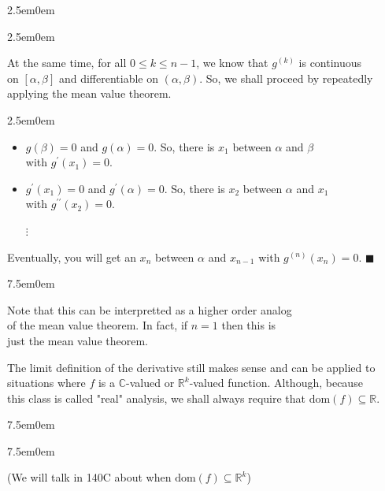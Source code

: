 \documentclass{book}
\newcommand{\teachComment}{
   \color{Orange}%
   \fontsize{12}{14}\selectfont%
}
\newenvironment{myIndent}{%
   \begin{adjustwidth}{2.5em}{0em}%
}{%
   \end{adjustwidth}%
}
\newenvironment{myTindent}{%
   \begin{adjustwidth}{7.5em}{0em}%
}{%
   \end{adjustwidth}%
}
\newcommand{\pprime}{{\prime\prime}}
\newcommand{\domain}[1]{\mathrm{dom}(#1)}
\newcommand{\retTwo}{\hfill\bigbreak}
\begin{document}
{\begin{myIndent}
{\begin{myIndent}
      At the same time, for all $0 \leq k \leq n-1$, we know that $g^{(k)}$ is continuous\\ on $[\alpha, \beta]$ and differentiable on $(\alpha, \beta)$. So, we shall proceed by repeatedly\\ applying the mean value theorem.
      \begin{myIndent}
         \begin{itemize}
            \item $g(\beta) = 0$ and $g(\alpha) = 0$. So, there is $x_1$ between $\alpha$ and $\beta$\\ with $g^\prime(x_1) = 0$.
            \item $g^\prime(x_1) = 0$ and $g^\prime(\alpha) = 0$. So, there is $x_2$ between $\alpha$ and $x_1$\\ with $g^\pprime(x_2) = 0$.
            
            {\centering\fontsize{18}{0}\selectfont $\vdots\phantom{aaaaaaa}$ \retTwo\par}
         \end{itemize}
      \end{myIndent}

      Eventually, you will get an $x_n$ between $\alpha$ and $x_{n-1}$ with $g^{(n)}(x_n) = 0$. $\blacksquare$\retTwo

      \begin{myTindent}\teachComment
         Note that this can be interpretted as a higher order analog\\ of the mean value theorem. In fact, if $n = 1$ then this is\\ just the mean value theorem.
      \end{myTindent}
   \end{myIndent}}
\end{myIndent}}

\newpage

The limit definition of the derivative still makes sense and can be applied to\\ situations where $f$ is a $\mathbb{C}$-valued or $\mathbb{R}^k$-valued function. Although, because\\ this class is called "real" analysis, we shall always require that $\domain{f} \subseteq \mathbb{R}$.
{\begin{myTindent}\begin{myTindent}\teachComment
   (We will talk in 140C about when $\domain{f} \subseteq \mathbb{R}^k$)\retTwo
\end{myTindent}\end{myTindent}}
\end{document}
